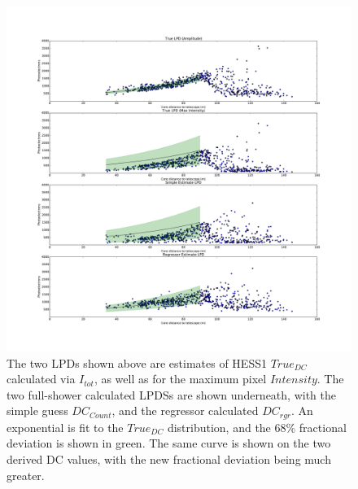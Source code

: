 \documentclass{article}
\begin{document}
\begin{figure}
\begin{center}
\includegraphics[width=\textwidth]{corsikalpd1}
\caption{The two LPDs shown above are estimates of HESS1 $True_{DC}$ calculated via $I_{tot}$, as well as for the maximum pixel $Intensity$. The two full-shower calculated LPDSs are shown underneath, with the simple guess $DC_{Count}$, and the regressor calculated $DC_{rgr}$. An exponential is fit to the $True_{DC}$ distribution, and the 68\% fractional deviation is shown in green. The same curve is shown on the two derived DC values, with the new fractional deviation being much greater.}
\label{fig:corsikalpd1}
\end{center}
\end{figure}
\end{document}
